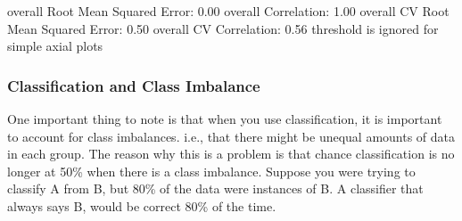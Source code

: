 \documentclass[letterpaper,10pt,english]{sphinxmanual}
\begin{document}
\begin{sphinxVerbatim}[commandchars=\\\{\}]
overall Root Mean Squared Error: 0.00
overall Correlation: 1.00
overall CV Root Mean Squared Error: 0.50
overall CV Correlation: 0.56
threshold is ignored for simple axial plots
\end{sphinxVerbatim}

\noindent{}

\noindent{}

\begin{sphinxVerbatim}[commandchars=\\\{\}]
  
       
\end{sphinxVerbatim}


\subsubsection{Classification and Class Imbalance}
\label{\detokenize{content/Multivariate_Prediction:classification-and-class-imbalance}}
One important thing to note is that when you use classification, it is important to account for class imbalances. i.e., that there might be unequal amounts of data in each group.  The reason why this is a problem is that chance classification is no longer at 50\% when there is a class imbalance.  Suppose you were trying to classify A from B, but 80\% of the data were instances of B. A classifier that always says B, would be correct 80\% of the time.
\end{document}
